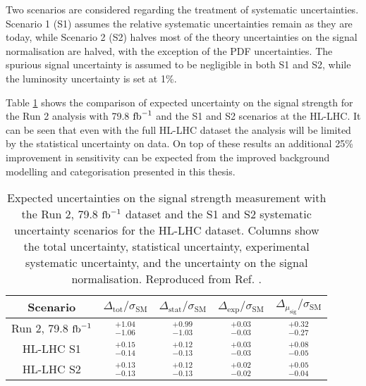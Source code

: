 Two scenarios are considered regarding the treatment of systematic
uncertainties. Scenario 1 (S1) assumes the relative systematic
uncertainties remain as they are today, while Scenario 2 (S2)
halves most of the theory uncertainties on the signal normalisation
are halved, with the exception of the PDF uncertainties. The
spurious signal uncertainty is assumed to be negligible in both S1
and S2, while the luminosity uncertainty is set at 1\%.

Table \ref{tab:out:res} shows the comparison of expected uncertainty
on the signal strength for the Run 2 analysis with 79.8 $\text{fb}^{-1}$
and the S1 and S2 scenarios at the HL-LHC. It can be seen that 
even with the full HL-LHC dataset the analysis will be limited
by the statistical uncertainty on data. On top of these results
an additional 25\% improvement in sensitivity can be expected
from the improved background modelling and categorisation
presented in this thesis.

\begin{table}[htb]
  \renewcommand{\arraystretch}{1.4}
  \centering
  \caption{
    Expected uncertainties on the signal strength measurement with
    the Run 2, 79.8 $\text{fb}^{-1}$ dataset and the S1 and S2 systematic
    uncertainty scenarios for the HL-LHC dataset. Columns show
    the total uncertainty, statistical uncertainty, experimental
    systematic uncertainty, and the uncertainty on the signal
    normalisation.
    Reproduced from Ref. \cite{ATL-PHYS-PUB-2018-054}.}
  \label{tab:out:res}
  \begin{tabular}{ccccc}
    \toprule
    Scenario & $\Delta_\text{tot}/\sigma_\text{SM}$ 
             & $\Delta_\text{stat}/\sigma_\text{SM}$ 
             & $\Delta_\text{exp}/\sigma_\text{SM}$ 
             & $\Delta_{\mu_\text{sig}}/\sigma_\text{SM}$ \\
    \midrule
    Run 2, 79.8 $\text{fb}^{-1}$ & $^{+1.04}_{-1.06}$ & $^{+0.99}_{-1.03}$ & $^{+0.03}_{-0.03}$ & $^{+0.32}_{-0.27}$ \\
    HL-LHC S1          & $^{+0.15}_{-0.14}$ & $^{+0.12}_{-0.13}$ & $^{+0.03}_{-0.03}$ & $^{+0.08}_{-0.05}$ \\
    HL-LHC S2          & $^{+0.13}_{-0.13}$ & $^{+0.12}_{-0.13}$ & $^{+0.02}_{-0.02}$ & $^{+0.05}_{-0.04}$ \\
    \bottomrule
  \end{tabular}
\end{table}




